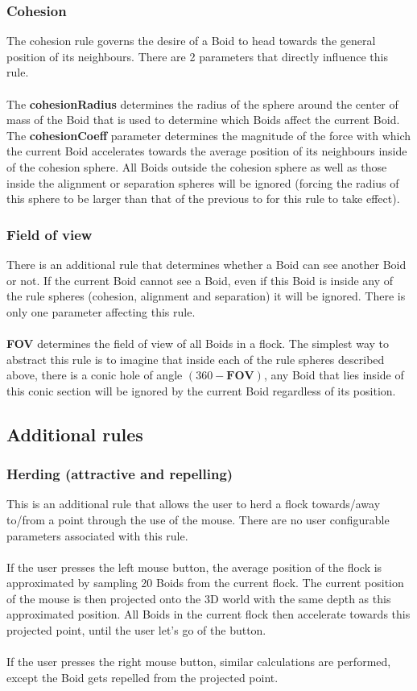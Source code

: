 \documentclass[12pt]{article}
\begin{document}
\subsubsection{Cohesion}
The cohesion rule governs the desire of a Boid to head towards the general position of its neighbours. There are 2 parameters that directly influence this rule.
\\ \\
The \textbf{cohesionRadius} determines the radius of the sphere around the center of mass of the Boid that is used to determine which Boids affect the current Boid. The \textbf{cohesionCoeff} parameter determines the magnitude of the force with which the current Boid  accelerates towards the average position of its neighbours inside of the cohesion sphere. All Boids outside the cohesion sphere as well as those inside the alignment or separation spheres will be ignored (forcing the radius of this sphere to be larger than that of the previous to for this rule to take effect).

\subsubsection{Field of view}
There is an additional rule that determines whether a Boid can see another Boid or not. If the current Boid cannot see a Boid, even if this Boid is inside any of the rule spheres (cohesion, alignment and separation) it will be ignored. There is only one parameter affecting this rule.
\\ \\
\textbf{FOV} determines the field of view of all Boids in a flock. The simplest way to abstract this rule is to imagine that inside each of the rule spheres described above, there is a conic hole of angle $(360 - \textbf{FOV})$, any Boid that lies inside of this conic section will be ignored by the current Boid regardless of its position.

\subsection{Additional rules}
\subsubsection{Herding (attractive and repelling)}
This is an additional rule that allows the user to herd a flock towards/away to/from a point through the use of the mouse. There are no user configurable parameters associated with this rule.
\\ \\
If the user presses the left mouse button, the average position of the flock is approximated by sampling 20 Boids from the current flock. The current position of the mouse is then projected onto the 3D world with the same depth as this approximated position. All Boids in the current flock then accelerate towards this projected point, until the user let's go of the button.
\\ \\
If the user presses the right mouse button, similar calculations are performed, except the Boid gets repelled from the projected point.
\end{document}
